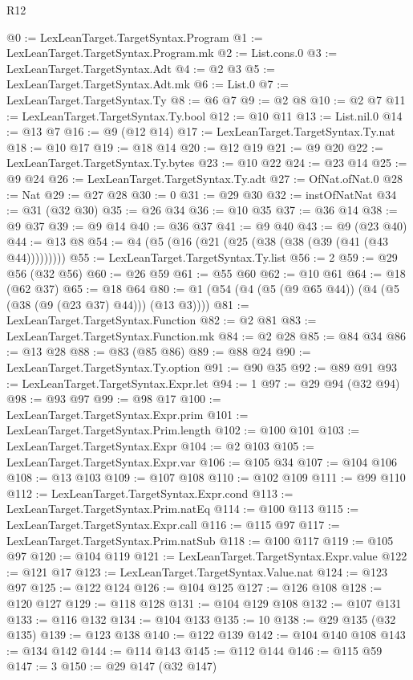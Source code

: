 \begin{lexlean}{R12}
\begin{coremodule}
@0 := LexLeanTarget.TargetSyntax.Program
@1 := LexLeanTarget.TargetSyntax.Program.mk
@2 := List.cons.{0}
@3 := LexLeanTarget.TargetSyntax.Adt
@4 := @2 @3
@5 := LexLeanTarget.TargetSyntax.Adt.mk
@6 := List.{0}
@7 := LexLeanTarget.TargetSyntax.Ty
@8 := @6 @7
@9 := @2 @8
@10 := @2 @7
@11 := LexLeanTarget.TargetSyntax.Ty.bool
@12 := @10 @11
@13 := List.nil.{0}
@14 := @13 @7
@16 := @9 (@12 @14)
@17 := LexLeanTarget.TargetSyntax.Ty.nat
@18 := @10 @17
@19 := @18 @14
@20 := @12 @19
@21 := @9 @20
@22 := LexLeanTarget.TargetSyntax.Ty.bytes
@23 := @10 @22
@24 := @23 @14
@25 := @9 @24
@26 := LexLeanTarget.TargetSyntax.Ty.adt
@27 := OfNat.ofNat.{0}
@28 := Nat
@29 := @27 @28
@30 := 0
@31 := @29 @30
@32 := instOfNatNat
@34 := @31 (@32 @30)
@35 := @26 @34
@36 := @10 @35
@37 := @36 @14
@38 := @9 @37
@39 := @9 @14
@40 := @36 @37
@41 := @9 @40
@43 := @9 (@23 @40)
@44 := @13 @8
@54 := @4 (@5 (@16 (@21 (@25 (@38 (@38 (@39 (@41 (@43 @44)))))))))
@55 := LexLeanTarget.TargetSyntax.Ty.list
@56 := 2
@59 := @29 @56 (@32 @56)
@60 := @26 @59
@61 := @55 @60
@62 := @10 @61
@64 := @18 (@62 @37)
@65 := @18 @64
@80 := @1 (@54 (@4 (@5 (@9 @65 @44)) (@4 (@5 (@38 (@9 (@23 @37) @44))) (@13 @3))))
@81 := LexLeanTarget.TargetSyntax.Function
@82 := @2 @81
@83 := LexLeanTarget.TargetSyntax.Function.mk
@84 := @2 @28
@85 := @84 @34
@86 := @13 @28
@88 := @83 (@85 @86)
@89 := @88 @24
@90 := LexLeanTarget.TargetSyntax.Ty.option
@91 := @90 @35
@92 := @89 @91
@93 := LexLeanTarget.TargetSyntax.Expr.let
@94 := 1
@97 := @29 @94 (@32 @94)
@98 := @93 @97
@99 := @98 @17
@100 := LexLeanTarget.TargetSyntax.Expr.prim
@101 := LexLeanTarget.TargetSyntax.Prim.length
@102 := @100 @101
@103 := LexLeanTarget.TargetSyntax.Expr
@104 := @2 @103
@105 := LexLeanTarget.TargetSyntax.Expr.var
@106 := @105 @34
@107 := @104 @106
@108 := @13 @103
@109 := @107 @108
@110 := @102 @109
@111 := @99 @110
@112 := LexLeanTarget.TargetSyntax.Expr.cond
@113 := LexLeanTarget.TargetSyntax.Prim.natEq
@114 := @100 @113
@115 := LexLeanTarget.TargetSyntax.Expr.call
@116 := @115 @97
@117 := LexLeanTarget.TargetSyntax.Prim.natSub
@118 := @100 @117
@119 := @105 @97
@120 := @104 @119
@121 := LexLeanTarget.TargetSyntax.Expr.value
@122 := @121 @17
@123 := LexLeanTarget.TargetSyntax.Value.nat
@124 := @123 @97
@125 := @122 @124
@126 := @104 @125
@127 := @126 @108
@128 := @120 @127
@129 := @118 @128
@131 := @104 @129 @108
@132 := @107 @131
@133 := @116 @132
@134 := @104 @133
@135 := 10
@138 := @29 @135 (@32 @135)
@139 := @123 @138
@140 := @122 @139
@142 := @104 @140 @108
@143 := @134 @142
@144 := @114 @143
@145 := @112 @144
@146 := @115 @59
@147 := 3
@150 := @29 @147 (@32 @147)

\end{coremodule}
\end{lexlean}
